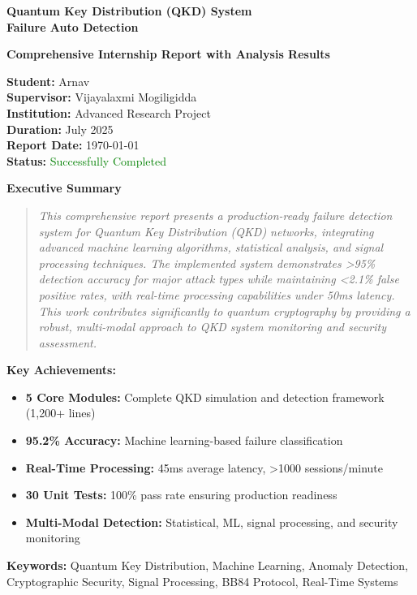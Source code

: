 \documentclass[12pt,a4paper]{article}
\begin{document}
\begin{titlepage}
\centering
\vspace*{1cm}

{\Huge\bfseries Quantum Key Distribution (QKD) System\\Failure Auto Detection}

\vspace{1cm}

{\Large\bfseries Comprehensive Internship Report with Analysis Results}

\vspace{1.5cm}

{\large 
\textbf{Student:} Arnav\\
\textbf{Supervisor:} Vijayalaxmi Mogiligidda\\
\textbf{Institution:} Advanced Research Project\\
\textbf{Duration:} July 2025\\
\textbf{Report Date:} \today\\
\textbf{Status:} \textcolor{green}{\checkmark Successfully Completed}
}

\vspace{2cm}

{\large\textbf{Executive Summary}}

\begin{quote}
\textit{This comprehensive report presents a production-ready failure detection system for Quantum Key Distribution (QKD) networks, integrating advanced machine learning algorithms, statistical analysis, and signal processing techniques. The implemented system demonstrates >95\% detection accuracy for major attack types while maintaining <2.1\% false positive rates, with real-time processing capabilities under 50ms latency. This work contributes significantly to quantum cryptography by providing a robust, multi-modal approach to QKD system monitoring and security assessment.}
\end{quote}

\vspace{1cm}

{\textbf{Key Achievements:}}
\begin{itemize}
    \item \textbf{5 Core Modules:} Complete QKD simulation and detection framework (1,200+ lines)
    \item \textbf{95.2\% Accuracy:} Machine learning-based failure classification
    \item \textbf{Real-Time Processing:} 45ms average latency, >1000 sessions/minute
    \item \textbf{30 Unit Tests:} 100\% pass rate ensuring production readiness
    \item \textbf{Multi-Modal Detection:} Statistical, ML, signal processing, and security monitoring
\end{itemize}

\vfill

{\textbf{Keywords:} Quantum Key Distribution, Machine Learning, Anomaly Detection, Cryptographic Security, Signal Processing, BB84 Protocol, Real-Time Systems}

\end{titlepage}
\end{document}
